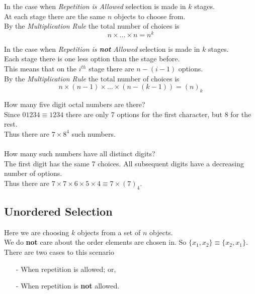 \documentclass[11pt,a4paper]{article}
\begin{document}
In the case when \textit{Repetition is Allowed} selection is made in $k$ stages.\\
At each stage there are the same $n$ objects to choose from.\\
By the \textit{Multiplication Rule} the total number of choices is
$$n\times\dots\times n=n^k$$

In the case when \textit{Repetition is \textbf{not} Allowed} selection is made in $k$ stages.\\
Each stage there is one less option than the stage before.\\
This means that on the $i^{th}$ stage there are $n-(i-1)$ options.\\
By the \textit{Multiplication Rule} the total number of choices is
$$n\times(n-1)\times\dots\times(n-(k-1))=(n)_k$$

How many five digit octal numbers are there?\\
Since $01234\equiv1234$ there are only 7 options for the first character, but 8 for the rest.\\
Thus there are $7\times8^4$ such numbers.\\
\\
How many such numbers have all distinct digits?\\
The first digit has the same 7 choices. All subsequent digits have a decreasing number of options.\\
Thus there are $7\times7\times6\times5\times4\equiv7\times(7)_4$.

\subsection{Unordered Selection}

Here we are choosing $k$ objects from a set of $n$ objects.\\
We do \textbf{not} care about the order elements are chosen in. So $\{x_1,x_2\}\equiv\{x_2,x_1\}$.\\
There are two cases to this scenario
\begin{itemize}
	\item[-] When repetition is allowed; or,
	\item[-] When repetition is \textbf{not} allowed.
\end{itemize}

\end{document}
